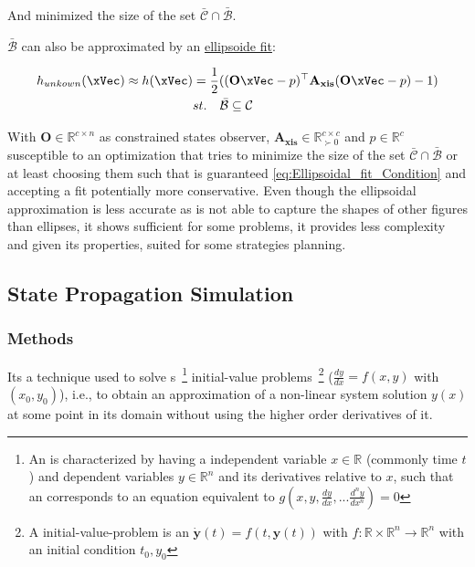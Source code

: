 And minimized the size of the set \(\bar{\mathcal{C} }\cap \bar{\mathcal{B}}\). \par
\(\bar{\mathcal{B}}\) can also be approximated by an \underline{ellipsoide fit}:

\begin{align}
        h_{unkown}(\xVec) \approx h(\xVec) &= \frac{1}{2}((\mathbf{O}\xVec - p)^{\top}\mathbf{A_{xis}}(\mathbf{O}\xVec - p) - 1) \label{eq:Ellipsoidal_fit} \\
        &st. \quad \bar{\mathcal{B}} \subseteq \mathcal{C} \label{eq:Ellipsoidal_fit_Condition}
\end{align}

With \(\mathbf{O} \in \mathbb{R}^{c \times n}\) as constrained states observer, \(\mathbf{A_{xis}} \in \mathbb{R}^{c \times c}_{\succ 0}\) and \(p \in \mathbb{R}^{c}\) susceptible to an optimization that tries to minimize the size of the set \(\bar{\mathcal{C} }\cap \bar{\mathcal{B}}\) or at least choosing them such that is guaranteed \ref{eq:Ellipsoidal_fit_Condition} and accepting a fit potentially more conservative. Even though the ellipsoidal approximation is less accurate as is not able to capture the shapes of other figures than ellipses, it shows sufficient for some problems, it provides less complexity and given its properties, suited for some strategies planning. \\


\subsection{State Propagation Simulation}
\label{subsub:State_Propagation_Simulation_Algorithm}

\subsubsection{ Methods}
\label{subsub:Runge-Kutta_Methods}

Its a technique used to solve s~\footnote{An  is characterized by having a independent variable \(x \in \mathbb{R}\) (commonly time \(t\)) and dependent variables \(y \in \mathbb{R}^n\) and its derivatives relative to \(x\), such that an  corresponds to an equation equivalent to \(g(x,y, \frac{dy}{dx}, ... \frac{d^{n}y}{dx^n})= 0\)  } initial-value problems~\footnote{A initial-value-problem is an  \(\dot{\mathbf{y}}(t) = f(t, \mathbf{y}(t))\) with \( f: \mathbb{R} \times \mathbb{R}^n \to \mathbb{R}^n\) with an initial condition \(t_0,y_0\)} (\(\frac{dy}{dx} = f(x,y)\) with \((x_0, y_0)\)), i.e., to obtain an approximation of a non-linear system solution \(y(x)\) at some point in its domain without using the higher order derivatives of it. \\

